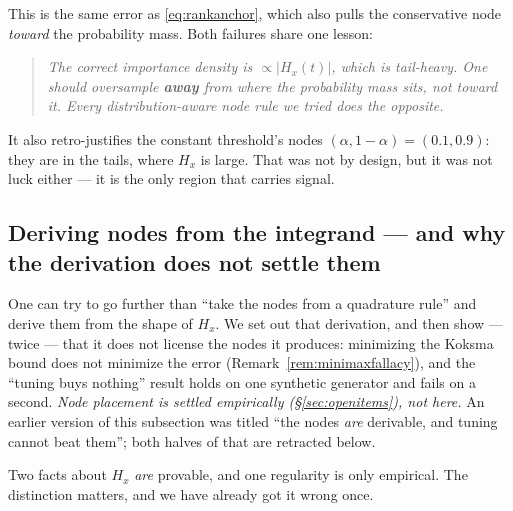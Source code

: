 \documentclass[11pt]{article}
\theoremstyle{remark}
\begin{document}
This is the same error as \eqref{eq:rankanchor}, which also pulls the conservative
node \emph{toward} the probability mass. Both failures share one lesson:

\begin{quote}
\emph{The correct importance density is $\propto |H_x(t)|$, which is tail-heavy. One
should oversample \textbf{away} from where the probability mass sits, not toward it.
Every distribution-aware node rule we tried does the opposite.}
\end{quote}

It also retro-justifies the constant threshold's nodes $(\alpha, 1-\alpha) = (0.1,
0.9)$: they are in the tails, where $H_x$ is large. That was not by design, but it was
not luck either --- it is the only region that carries signal.

\subsection{Deriving nodes from the integrand --- and why the derivation does not
settle them}\label{sec:derivednodes}

One can try to go further than ``take the nodes from a quadrature rule'' and derive
them from the shape of $H_x$. We set out that derivation, and then show --- twice ---
that it does not license the nodes it produces: minimizing the Koksma bound does not
minimize the error (Remark~\ref{rem:minimaxfallacy}), and the ``tuning buys nothing''
result holds on one synthetic generator and fails on a second. \emph{Node placement is
settled empirically (\S\ref{sec:openitems}), not here.} An earlier version of this
subsection was titled ``the nodes \emph{are} derivable, and tuning cannot beat them'';
both halves of that are retracted below.

Two facts about $H_x$ \emph{are} provable, and one regularity is only empirical. The
distinction matters, and we have already got it wrong once.
\end{document}
